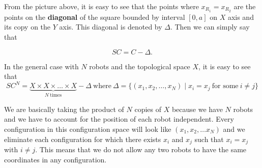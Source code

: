 \documentclass{article}
\theoremstyle{definition}
\begin{document}
\begin{figure}[H]
\centering
{}
\end{figure}

From the picture above, it is easy to see that the points where $x_{R_1} = x_{R_2}$
are the points on the \textbf{diagonal} of the square bounded by interval $[0, a]$ on $X$ axis
and its copy on the $Y$ axis. This diagonal is denoted by $\Delta$. Then we can simply
say that

$$SC = C - \Delta.$$

In the general case with $N$ robots and the topological space $X$, it is easy to see that
$$SC^N = \underbrace{X \times X \times \dots \times X}_{N \ \text{times}} - \Delta \ \text{where} \ \Delta = \{(x_1, x_2, \dots, x_N) \mid x_i = x_j \ \text{for some} \ i \neq j\}$$

We are basically taking the product of $N$ copies of $X$ because we have $N$ robots
and we have to account for the position of each robot independent. Every configuration
in this configuration space will look like $(x_1, x_2, \dots x_N)$ and we eliminate each
configuration for which there exists $x_i$ and $x_j$ such that $x_i = x_j$ with $i \neq j$.
This means that we do not allow any two robots to have the same coordinates in any configuration.

\end{document}
